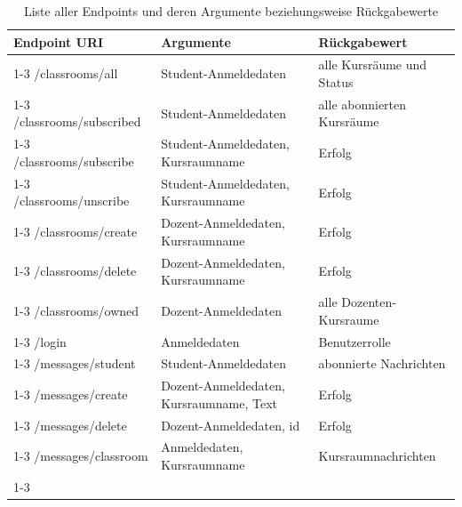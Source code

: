\begin{table}[H]
\begin{tabular}{l|l|l}
\textbf{Endpoint URI} & \textbf{Argumente}  & \textbf{Rückgabewert}\\ \cline{1-3}
/classrooms/all & Student-Anmeldedaten & alle Kursräume und Status  \\ \cline{1-3}
/classrooms/subscribed & Student-Anmeldedaten & alle abonnierten Kursräume \\ \cline{1-3}
/classrooms/subscribe & Student-Anmeldedaten, Kursraumname & Erfolg \\ \cline{1-3}
/classrooms/unscribe & Student-Anmeldedaten, Kursraumname & Erfolg \\ \cline{1-3}
/classrooms/create & Dozent-Anmeldedaten, Kursraumname & Erfolg \\ \cline{1-3}
/classrooms/delete & Dozent-Anmeldedaten, Kursraumname & Erfolg \\ \cline{1-3}
/classrooms/owned & Dozent-Anmeldedaten & alle Dozenten-Kursraume\\ \cline{1-3}
/login & Anmeldedaten & Benutzerrolle \\ \cline{1-3}
/messages/student & Student-Anmeldedaten & abonnierte Nachrichten \\ \cline{1-3}
/messages/create & Dozent-Anmeldedaten, Kursraumname, Text &  Erfolg\\ \cline{1-3}
/messages/delete & Dozent-Anmeldedaten, id & Erfolg\\ \cline{1-3}
/messages/classroom & Anmeldedaten, Kursraumname & Kursraumnachrichten\\ \cline{1-3}
\end{tabular}
\caption{Liste aller Endpoints und deren Argumente beziehungsweise Rückgabewerte}
\label{table:endpoints}
\end{table}